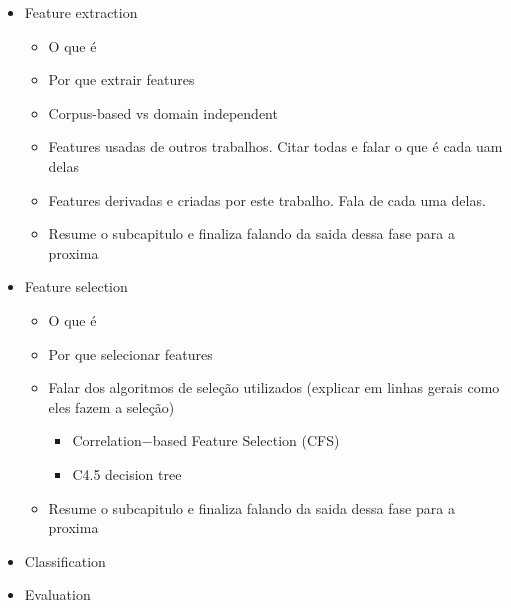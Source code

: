 \documentclass[msc, a4paper, classic, pt]{ufbathesis}
\begin{document}
\begin{itemize}
\begin{itemize}
\item Feature extraction
\begin{itemize}
\item O que é
\item Por que extrair features
\item Corpus-based vs domain independent 
\item Features usadas de outros trabalhos. Citar todas e falar o que é cada uam delas
\item Features derivadas e criadas por este trabalho. Fala de cada uma delas. 
\item Resume o subcapitulo e finaliza falando da saida dessa fase para a proxima
\end{itemize}

\item Feature selection
\begin{itemize}
\item O que é
\item Por que selecionar features
\item Falar dos algoritmos de seleção utilizados (explicar em linhas gerais como eles fazem a seleção)
\begin{itemize}
\item Correlation$-$based Feature Selection (CFS)
\item C4.5 decision tree
\end{itemize}
\item Resume o subcapitulo e finaliza falando da saida dessa fase para a proxima 
\end{itemize}

\item Classification
\item Evaluation
\end{itemize}
\end{itemize}




\backmatter

\appendix

% 
% 
% 





\end{document}

